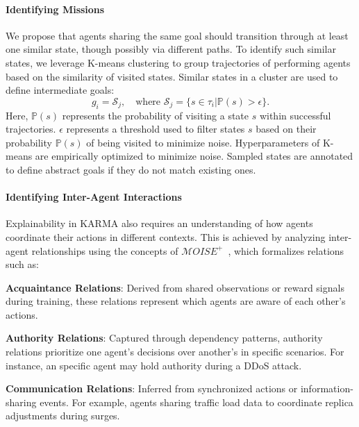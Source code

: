 \paragraph*{\textbf{Identifying Missions}}

We propose that agents sharing the same goal should transition through at least one similar state, though possibly via different paths. To identify such similar states, we leverage K-means clustering to group trajectories of performing agents based on the similarity of visited states. Similar states in a cluster are used to define intermediate goals:
\[
  g_i = \mathcal{S}_j, \quad \text{where } \mathcal{S}_j = \{s \in \tau_i | \mathbb{P}(s) > \epsilon\}.
\]
Here, $\mathbb{P}(s)$ represents the probability of visiting a state $s$ within successful trajectories. $\epsilon$ represents a threshold used to filter states $s$ based on their probability $\mathbb{P}(s)$ of being visited to minimize noise. Hyperparameters of K-means are empirically optimized to minimize noise. Sampled states are annotated to define abstract goals if they do not match existing ones.


\paragraph*{\textbf{Identifying Inter-Agent Interactions}}

Explainability in KARMA also requires an understanding of how agents coordinate their actions in different contexts. This is achieved by analyzing inter-agent relationships using the concepts of $\mathcal{M}OISE^+$~\cite{hubner2002moise}, which formalizes relations such as:
\begin{enumerate*}[label=\textbf{\arabic*)}, itemjoin={;\quad }]
  \item \textbf{Acquaintance Relations}: Derived from shared observations or reward signals during training, these relations represent which agents are aware of each other's actions.
  \item \textbf{Authority Relations}: Captured through dependency patterns, authority relations prioritize one agent's decisions over another's in specific scenarios. For instance, an specific agent may hold authority during a DDoS attack.
  \item \textbf{Communication Relations}: Inferred from synchronized actions or information-sharing events. For example, agents sharing traffic load data to coordinate replica adjustments during surges.
\end{enumerate*}

